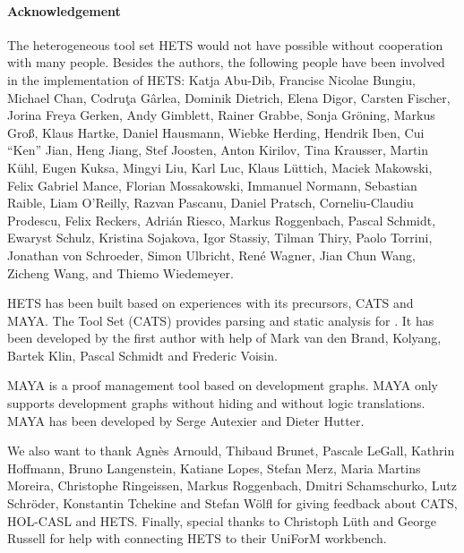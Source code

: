 \documentclass{article}
\newcommand{\normalTEXTSC}[2]{{#1\scriptsize#2}}
\newcommand     {\MAYA}{\normalTEXTSC{M}{AYA}\xspace}
\newcommand     {\Hets}{\normalTEXTSC{H}{ETS}\xspace}
\newcommand     {\Cats}{\normalTEXTSC{C}{ATS}\xspace}
\begin{document}
\paragraph{Acknowledgement}
The heterogeneous tool set \Hets would not have possible
without cooperation with many people.
Besides the authors, the following people have been involved
in the implementation of \Hets:
Katja Abu-Dib,
Francisc Nicolae Bungiu,
Michael Chan,
Codru\c ta G\^ arlea,
Dominik Dietrich,
Elena Digor,
Carsten Fischer,
Jorina Freya Gerken,
Andy Gimblett,
Rainer Grabbe,
Sonja Gr\"{o}ning,
Markus Groß,
Klaus Hartke,
Daniel Hausmann,
Wiebke Herding,
Hendrik Iben,
Cui ``Ken'' Jian,
Heng Jiang,
Stef Joosten,
Anton Kirilov,
Tina Krausser,
Martin K\"{u}hl,
Eugen Kuksa,
Mingyi Liu,
Karl Luc,
Klaus L\"{u}ttich,
Maciek Makowski,
Felix Gabriel Mance,
Florian Mossakowski,
Immanuel Normann,
Sebastian Raible,
Liam O'Reilly,
Razvan Pascanu,
Daniel Pratsch,
Corneliu-Claudiu Prodescu,
Felix Reckers,
Adri\'{a}n Riesco,
Markus Roggenbach,
Pascal Schmidt,
Ewaryst Schulz,
Kristina Sojakova,
Igor Stassiy,
Tilman Thiry,
Paolo Torrini,
Jonathan von Schroeder,
Simon Ulbricht,
Ren\'{e} Wagner,
Jian Chun Wang,
Zicheng Wang, and
Thiemo Wiedemeyer.

\Hets has been built based on experiences with its
precursors,
                \index{Cats@\Cats}%
\Cats and
                \index{Maya@\MAYA}%
\MAYA.
The \CASL Tool Set (\Cats)
\cite{Mossakowski:2000:CST,Mossakowski:1998:SSA}
provides parsing and static analysis for \CASL.
It has been developed by the first author with help
of Mark van den Brand, Kolyang, Bartek Klin, Pascal Schmidt and
Frederic Voisin.

\MAYA \cite{Autexier:2002:IHD,AutexierEtal02} is a proof management
tool based on development graphs.  \MAYA only supports development
graphs without hiding and without logic translations.  \MAYA has been
developed by Serge Autexier and Dieter Hutter.

We also want to thank Agn\`es Arnould, Thibaud Brunet, Pascale LeGall,
Kathrin Hoffmann, Bruno Langenstein, Katiane Lopes,
Stefan Merz, Maria Martins Moreira, Christophe
Ringeissen, Markus Roggenbach, Dmitri Schamschurko, Lutz Schr\"oder,
Konstantin Tchekine and Stefan W\"olfl
for giving feedback about \Cats, HOL-CASL and \Hets. Finally,
special thanks to Christoph L\"uth and George Russell
for help with connecting \Hets to their UniForM workbench.




\end{document}
